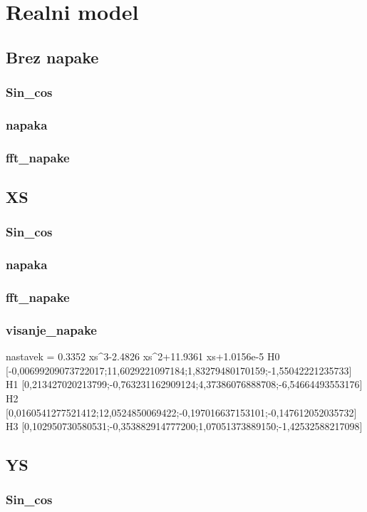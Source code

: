 

\chapter{Realni model}
\section{Brez napake}
\subsection{Sin\_cos}
\subsection{napaka}
\subsection{fft\_napake}
\section{XS}
\subsection{Sin\_cos}
\subsection{napaka}
\subsection{fft\_napake}
\subsection{visanje\_napake}

nastavek = 0.3352 xs^3-2.4826 xs^2+11.9361 xs+1.0156e-5
H0	[-0,00699209073722017;11,6029221097184;1,83279480170159;-1,55042221235733]
H1	[0,213427020213799;-0,763231162909124;4,37386076888708;-6,54664493553176]
H2	[0,0160541277521412;12,0524850069422;-0,197016637153101;-0,147612052035732]
H3	[0,102950730580531;-0,353882914777200;1,07051373889150;-1,42532588217098]

\section{YS}
\subsection{Sin\_cos}
